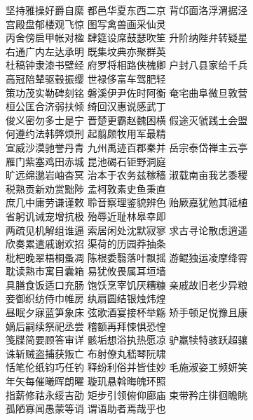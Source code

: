 \documentclass{article}
\begin{document}
\noindent
坚持雅操好爵自縻 都邑华夏东西二京 背邙面洛浮渭据泾\\
宫殿盘郁楼观飞惊 图写禽兽画采仙灵\\
丙舍傍启甲帐对楹 肆筵设席鼓瑟吹笙 升阶纳陛弁转疑星\\
右通广内左达承明 既集坟典亦聚群英\\
杜稿钟隶漆书壁经 府罗将相路侠槐卿 户封八县家给千兵\\
高冠陪辇驱毂振缨 世禄侈富车驾肥轻\\
策功茂实勒碑刻铭 磐溪伊尹佐时阿衡 奄宅曲阜微旦敦营\\
桓公匡合济弱扶倾 绮回汉惠说感武丁\\
俊义密勿多士是宁 晋楚更霸赵魏困横 假途灭虢践土会盟\\
何遵约法韩弊烦刑 起翦颇牧用军最精\\

\noindent
宣威沙漠驰誉丹青 九州禹迹百郡秦并 岳宗泰岱禅主云亭\\
雁门紫塞鸡田赤城 昆池碣石钜野洞庭\\
旷远绵邈岩岫杳冥 治本于农务兹稼穑 淑载南亩我艺黍稷\\
税熟贡新劝赏黜陟 孟柯敦素史鱼秉直\\
庶几中庸劳谦谨敕 聆音察理鉴貌辨色 贻厥嘉犹勉其祗植\\
省躬讥诫宠增抗极 殆辱近耻林皋幸即\\
两疏见机解组谁逼 索居闲处沈默寂寥 求古寻论散虑逍遥\\
欣奏累遣戚谢欢招 渠荷的历园莽抽条\\
枇杷晚翠梧桐蚤凋 陈根委翳落叶飘摇 游鲲独运凌摩绛霄\\
耽读熟市寓目囊箱 易犹攸畏属耳垣墙\\

\noindent
具膳食饭适口充肠 饱饫烹宰饥厌糟糠 亲戚故旧老少异粮\\
妾御织纺侍巾帷房 纨扇圆结银烛炜煌\\
昼眠夕寐蓝笋象床 弦歌酒宴接杯举觞 矫手顿足悦豫且康\\
嫡后嗣续祭祀丞尝 稽额再拜悚惧恐惶\\
笺牒简要顾答审详 骸垢想浴执热愿凉 驴羸犊特骇跃超骧\\
诛斩贼盗捕获叛亡 布射僚丸嵇琴阮啸\\
恬笔伦纸钧巧任钓 释纷利俗并皆佳妙 毛施淑姿工频妍笑\\
年矢每催曦晖朗曜 璇玑悬斡晦魄环照\\
指薪修祜永绥吉劭 矩步引领俯仰廊庙 束带矜庄徘徊瞻眺\\
孤陋寡闻愚蒙等诮 谓语助者焉哉乎也\\
\end{document}
